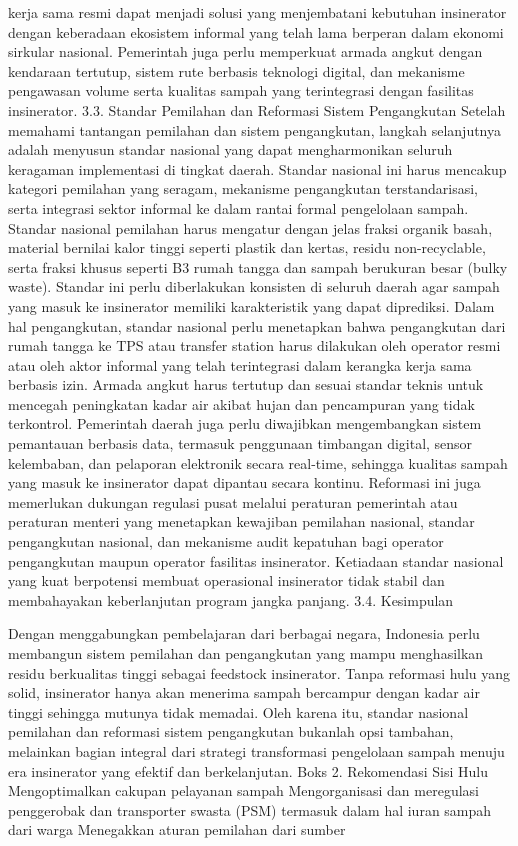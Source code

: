 \documentclass[
  letterpaper,
  DIV=11,
  numbers=noendperiod]{scrreprt}
\begin{document}
kerja sama resmi dapat menjadi solusi yang menjembatani kebutuhan
insinerator dengan keberadaan ekosistem informal yang telah lama
berperan dalam ekonomi sirkular nasional. Pemerintah juga perlu
memperkuat armada angkut dengan kendaraan tertutup, sistem rute berbasis
teknologi digital, dan mekanisme pengawasan volume serta kualitas sampah
yang terintegrasi dengan fasilitas insinerator. 3.3. Standar Pemilahan
dan Reformasi Sistem Pengangkutan Setelah memahami tantangan pemilahan
dan sistem pengangkutan, langkah selanjutnya adalah menyusun standar
nasional yang dapat mengharmonikan seluruh keragaman implementasi di
tingkat daerah. Standar nasional ini harus mencakup kategori pemilahan
yang seragam, mekanisme pengangkutan terstandarisasi, serta integrasi
sektor informal ke dalam rantai formal pengelolaan sampah. Standar
nasional pemilahan harus mengatur dengan jelas fraksi organik basah,
material bernilai kalor tinggi seperti plastik dan kertas, residu
non-recyclable, serta fraksi khusus seperti B3 rumah tangga dan sampah
berukuran besar (bulky waste). Standar ini perlu diberlakukan konsisten
di seluruh daerah agar sampah yang masuk ke insinerator memiliki
karakteristik yang dapat diprediksi. Dalam hal pengangkutan, standar
nasional perlu menetapkan bahwa pengangkutan dari rumah tangga ke TPS
atau transfer station harus dilakukan oleh operator resmi atau oleh
aktor informal yang telah terintegrasi dalam kerangka kerja sama
berbasis izin. Armada angkut harus tertutup dan sesuai standar teknis
untuk mencegah peningkatan kadar air akibat hujan dan pencampuran yang
tidak terkontrol. Pemerintah daerah juga perlu diwajibkan mengembangkan
sistem pemantauan berbasis data, termasuk penggunaan timbangan digital,
sensor kelembaban, dan pelaporan elektronik secara real-time, sehingga
kualitas sampah yang masuk ke insinerator dapat dipantau secara kontinu.
Reformasi ini juga memerlukan dukungan regulasi pusat melalui peraturan
pemerintah atau peraturan menteri yang menetapkan kewajiban pemilahan
nasional, standar pengangkutan nasional, dan mekanisme audit kepatuhan
bagi operator pengangkutan maupun operator fasilitas insinerator.
Ketiadaan standar nasional yang kuat berpotensi membuat operasional
insinerator tidak stabil dan membahayakan keberlanjutan program jangka
panjang. 3.4. Kesimpulan

Dengan menggabungkan pembelajaran dari berbagai negara, Indonesia perlu
membangun sistem pemilahan dan pengangkutan yang mampu menghasilkan
residu berkualitas tinggi sebagai feedstock insinerator. Tanpa reformasi
hulu yang solid, insinerator hanya akan menerima sampah bercampur dengan
kadar air tinggi sehingga mutunya tidak memadai. Oleh karena itu,
standar nasional pemilahan dan reformasi sistem pengangkutan bukanlah
opsi tambahan, melainkan bagian integral dari strategi transformasi
pengelolaan sampah menuju era insinerator yang efektif dan
berkelanjutan. Boks 2. Rekomendasi Sisi Hulu Mengoptimalkan cakupan
pelayanan sampah Mengorganisasi dan meregulasi penggerobak dan
transporter swasta (PSM) termasuk dalam hal iuran sampah dari warga
Menegakkan aturan pemilahan dari sumber
\end{document}
